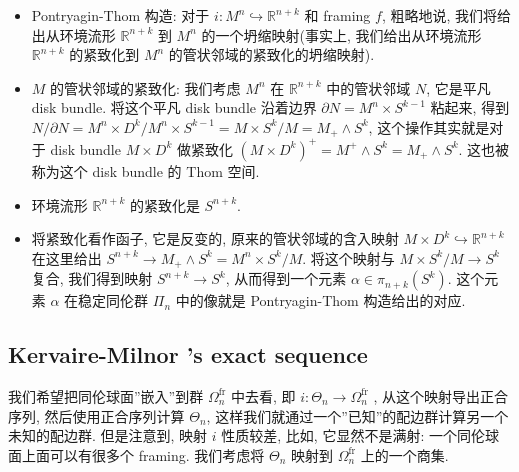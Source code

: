 \documentclass[
]{ctexart}
\providecommand{\tightlist}{%
  \setlength{\itemsep}{0pt}\setlength{\parskip}{0pt}}
\begin{document}
\begin{itemize}
\begin{itemize}
    \begin{itemize}
    \tightlist
    \item
      Pontryagin-Thom 构造: 对于
      \(i:M^n \hookrightarrow \mathbb{R}^{n+k}\) 和 framing \(f\),
      粗略地说, 我们将给出从环境流形 \(\mathbb{R}^{n+k}\) 到 \(M^n\)
      的一个坍缩映射(事实上, 我们给出从环境流形 \(\mathbb{R}^{n+k}\)
      的紧致化到 \(M^n\) 的管状邻域的紧致化的坍缩映射).\\
    \item
      \(M\) 的管状邻域的紧致化: 我们考虑 \(M^n\) 在 \(\mathbb{R}^{n+k}\)
      中的管状邻域 \(N\), 它是平凡 disk bundle. 将这个平凡 disk bundle
      沿着边界 \(\partial N=M^n\times S^{k-1}\) 粘起来, 得到
      \(N/\partial N=M^n\times D^k/M^n\times S^{k-1}=M\times S^k/M=M_+\wedge S^k\),
      这个操作其实就是对于 disk bundle \(M\times D^k\) 做紧致化
      \(\left(M\times D^k\right)^+=M^+\wedge S^k=M_+\wedge S^k\).
      这也被称为这个 disk bundle 的 Thom 空间.
    \item
      环境流形 \(\mathbb{R}^{n+k}\) 的紧致化是 \(S^{n+k}\).
    \item
      将紧致化看作函子, 它是反变的, 原来的管状邻域的含入映射
      \(M\times D^k\hookrightarrow \mathbb{R}^{n+k}\) 在这里给出
      \(S^{n+k}\to M_+\wedge S^k=M^n\times S^k/M\). 将这个映射与
      \(M\times S^k/M\to S^k\) 复合, 我们得到映射 \(S^{n+k} \to S^k\),
      从而得到一个元素 \(\alpha \in \pi_{n+k}(S^k)\). 这个元素
      \(\alpha\) 在稳定同伦群 \(\Pi_n\) 中的像就是 Pontryagin-Thom
      构造给出的对应.
    \end{itemize}
  \end{itemize}
\end{itemize}

\subsection{Kervaire-Milnor 's exact
sequence}\label{kervaire-milnor-s-exact-sequence}

我们希望把同伦球面''嵌入''到群 \(\Omega_n^{\text{fr}}\) 中去看, 即
\(i:\Theta_n \rightarrow \Omega_n^{\text{fr}}\) ,
从这个映射导出正合序列, 然后使用正合序列计算 \(\Theta_n\),
这样我们就通过一个''已知''的配边群计算另一个未知的配边群. 但是注意到,
映射 \(i\) 性质较差, 比如, 它显然不是满射: 一个同伦球面上面可以有很多个
framing. 我们考虑将 \(\Theta_n\) 映射到 \(\Omega_n^{\text{fr}}\)
上的一个商集.
\end{document}
